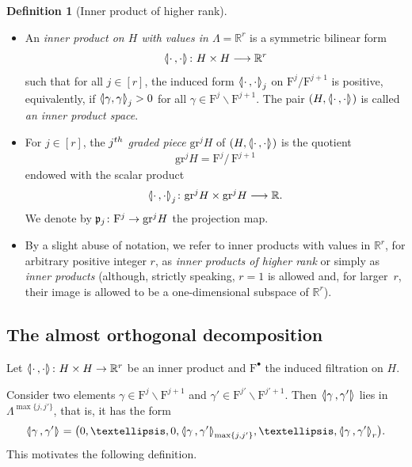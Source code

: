 \documentclass[10pt,a4paper]{amsart}
\newcommand{\llangle}{\mathopen{\langle\mkern -3.1mu\lvert}}
\newcommand{\rrangle}{\mathclose{\rvert\mkern -3.1mu\rangle}}
\newcommand{\highinn}[2]{{\llangle#2\rrangle_{#1}}}
\newcommand{\rquot}[2]{#1/\,#2}
\newcommand{\filter}{\mathrm{F}}
\newcommand{\R}{\mathbb{R}}
\newcommand{\grm}[2]{\mathrm{gr}_{#1}^{#2}}
\newcommand{\proj}{\mathfrak{p}}
\renewcommand{\setminus}{\smallsetminus}
\renewcommand*{\to}{\mathchoice{\longrightarrow}{\rightarrow}{\rightarrow}{\rightarrow}}
\theoremstyle{definition}\newtheorem{defi}[cdrthm]{Definition}
\begin{document}
\setcounter{cdrthm}{4}
\begin{defi}[Inner product of higher rank] \label{defi:InnerProduct}\leavevmode
\begin{itemize}
\item An \emph{inner product on $H$ with values in $\Lambda = \R^r$} is a symmetric bilinear form
\[
\highinn{}{\cdot\,, \cdot} \colon H \times H \to \R^r
\]
such that for all $j \in [r]$, the induced form $\highinn{j}{\cdot\,, \cdot}$ on $\filter^j / \filter^{j+1}$ is positive, equivalently, if $\highinn{j}{\gamma, \gamma} >0$ for all $\gamma \in \filter^j \setminus \filter^{j+1}$. The pair $(H, \highinn{}{\cdot\,, \cdot})$ is called \emph{an inner product space}.

\item For $j \in [r]$, the $j^{\rm th}$ \emph{graded piece} $\grm{}{j}H$ of $(H, \highinn{}{\cdot\,, \cdot})$ is the quotient
\[
\grm{}{j}H = \rquot{\filter^j}{\filter^{j+1}}
\]
endowed with the scalar product
\[
\highinn{j}{\cdot\,, \cdot} \colon \grm{}{j}H\times \grm{}{j}H \to \R.
\]
We denote by $\proj_j \colon \filter^j \to \grm{}{j}H$ the projection map.

\item By a slight abuse of notation, we refer to inner products with values in $\R^r$, for arbitrary positive integer $r$, as \emph{inner products of higher rank} or simply as \emph{inner products} (although, strictly speaking, $r=1$ is allowed and, for larger~$r$, their image is allowed to be a one-dimensional subspace of $\R^r$).%
\end{itemize}
\end{defi}

\setcounter{cdrthm}{16}
\subsection{The almost orthogonal decomposition} \label{ss:AlmostOrthogonalDecomposition}
Let $\highinn{}{\cdot\,,\cdot} \colon H \times H \to \R^r$ be an inner product and $\filter^\bullet$ the induced filtration on $H$.



Consider two elements $\gamma \in \filter^{j} \setminus \filter^{j+1}$ and $\gamma' \in \filter^{j'} \setminus \filter^{j'+1}$. Then $\highinn{}{\gamma\,,\gamma'}$ lies in ${\Lambda}^{\max\{j, j'\}}$, that is, it has the form
\[
\highinn{}{\gamma\,,\gamma'} = \bigl(0, \dots, 0, \highinn{\max\{j, j'\}}{\gamma\,,\gamma'}, \dots, \highinn{r}{\gamma\,,\gamma'} \bigr).
\]
This motivates the following definition.
\end{document}

